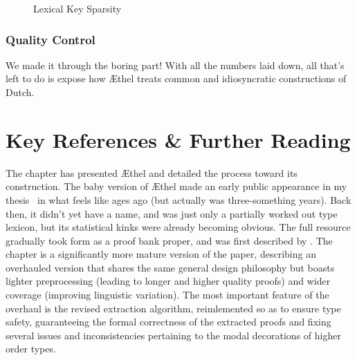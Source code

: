 \begin{figure}
	\centering
	\caption{Lexical Key Sparsity}
	\label{figure:entry_sparsity}
\end{figure}

\subsubsection{Quality Control}
We made it through the boring part!
With all the numbers laid down, all that's left to do is expose how \AE thel treats common and idiosyncratic constructions of Dutch.

\todo




\section{Key References \& Further Reading}
The chapter has presented \AE thel and detailed the process toward its construction.
The baby version of \AE thel made an early public appearance in my thesis~\cite{https://doi.org/10.48550/arxiv.1909.02955} in what feels like ages ago (but actually was three-something years).
Back then, it didn't yet have a name, and was just only a partially worked out type lexicon, but its statistical kinks were already becoming obvious.
The full resource gradually took form as a proof bank proper, and was first described by \citet{kogkalidis-etal-2020-aethel}.
The chapter is a significantly more mature version of the paper, describing an overhauled version that shares the same general design philosophy but boasts lighter preprocessing (leading to longer and higher quality proofs) and wider coverage (improving linguistic variation).
The most important feature of the overhaul is the revised extraction algorithm, reimlemented so as to ensure type safety, guaranteeing the formal correctness of the extracted proofs and fixing several issues and inconsistencies pertaining to the modal decorations of higher order types.

